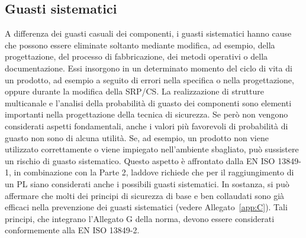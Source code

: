 \subsection{Guasti sistematici}
\label{subsec:06-1-2}
A differenza dei guasti casuali dei componenti, i guasti sistematici hanno cause che possono essere eliminate soltanto mediante modifica, ad esempio, della progettazione, del processo di fabbricazione, dei metodi operativi o della documentazione. Essi insorgono in un determinato momento del ciclo di vita di un prodotto, ad esempio a seguito di errori nella specifica o nella progettazione, oppure durante la modifica della SRP/CS. La realizzazione di strutture multicanale e l'analisi della probabilità di guasto dei componenti sono elementi importanti nella progettazione della tecnica di sicurezza. Se però non vengono considerati aspetti fondamentali, anche i valori più favorevoli di probabilità di guasto non sono di alcuna utilità. Se, ad esempio, un prodotto non viene utilizzato correttamente o viene impiegato nell'ambiente sbagliato, può sussistere un rischio di guasto sistematico. Questo aspetto è affrontato dalla EN ISO 13849-1, in combinazione con la Parte 2, laddove richiede che per il raggiungimento di un PL siano considerati anche i possibili guasti sistematici. In sostanza, si può affermare che molti dei principi di sicurezza di base e ben collaudati sono già efficaci nella prevenzione dei guasti sistematici (vedere Allegato~\ref{app:C}). Tali principi, che integrano l'Allegato G della norma, devono essere considerati conformemente alla EN ISO 13849-2.

